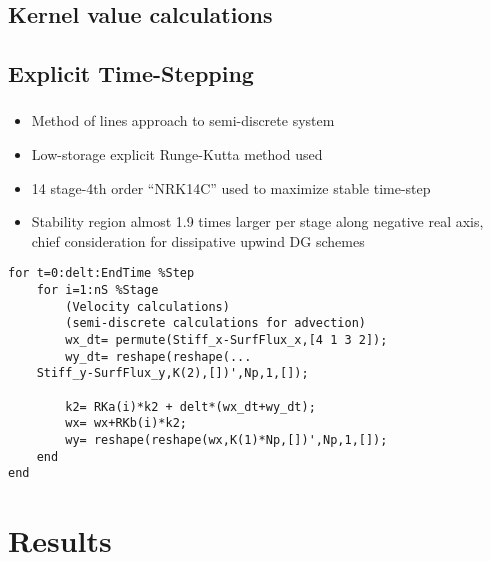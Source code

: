 \documentclass{beamer}
\begin{document}
\subsection{Kernel value calculations} 

\subsection{Explicit Time-Stepping} 
\begin{frame}[fragile]\frametitle{\subsecname}
\begin{itemize}
\item Method of lines approach to semi-discrete system
\item Low-storage explicit Runge-Kutta method used
\item 14 stage-4th order ``NRK14C'' used to maximize stable time-step\footnotemark[7]
\item Stability region almost 1.9 times larger per stage along negative real axis, chief consideration for dissipative upwind DG schemes
\end{itemize}
\begin{lstlisting}
for t=0:delt:EndTime %Step
    for i=1:nS %Stage
        (Velocity calculations)
        (semi-discrete calculations for advection)
        wx_dt= permute(Stiff_x-SurfFlux_x,[4 1 3 2]);
        wy_dt= reshape(reshape(...
	Stiff_y-SurfFlux_y,K(2),[])',Np,1,[]);
        
        k2= RKa(i)*k2 + delt*(wx_dt+wy_dt);
        wx= wx+RKb(i)*k2;
        wy= reshape(reshape(wx,K(1)*Np,[])',Np,1,[]);
    end
end
\end{lstlisting}
\end{frame}

\section{Results}
\end{document}
